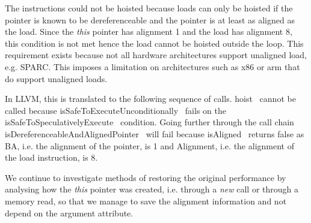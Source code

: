 The instructions could not be hoisted because loads can only be hoisted if the
pointer is known to be dereferenceable and the pointer is at least as aligned as
the load. Since the \textit{this} pointer has alignment 1 and the load has
alignment 8, this condition is not met hence the load cannot be hoisted outside
the loop. This requirement exists because not all hardware architectures support
unaligned load, e.g. SPARC. This imposes a limitation on architectures such as
x86 or arm that do support unaligned loads.

In LLVM, this is translated to the following sequence of calls.
hoist~\cite{hoist} cannot be called because
isSafeToExecuteUnconditionally~\cite{isSafeToExecuteUnconditionally} fails on
the isSafeToSpeculativelyExecute~\cite{isSafeToSpeculativelyExecute} condition.
Going further through the call chain
isDereferenceableAndAlignedPointer~\cite{isDereferenceableAndAlignedPointer}
will fail because isAligned~\cite{isAligned} returns false as BA, i.e. the
alignment of the pointer, is 1 and Alignment, i.e. the alignment of the
load instruction, is 8.

We continue to investigate methods of restoring the original performance by
analysing how the \textit{this} pointer was created, i.e. through a \textit{new}
call or through a memory read, so that we manage to save the alignment
information and not depend on the argument attribute.
